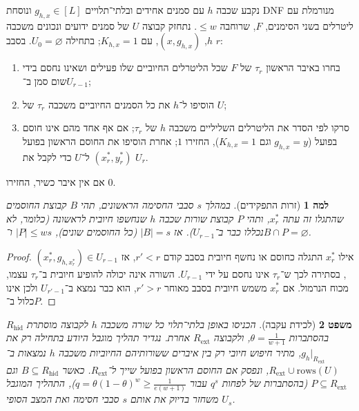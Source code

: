 \documentclass[11pt,a4paper]{article}
\newtheorem{theorem}{משפט}[section]
\newtheorem{lemma}[theorem]{למה}
\theoremstyle{definition}
\theoremstyle{remark}
\newcommand{\EN}[1]{\textenglish{#1}}
\begin{document}
נקבע שכבה $h$ עם סמנים אחידים ובלתי־תלויים $g_{h,x} \in [L]$ ונוסחת \EN{DNF} מנורמלת עם ליטרלים בשני הסימנים, $F$, שרוחבה $\le w$. נתחזק קבוצה $U$ של סמנים ידועים ונכונים משכבה $h$, $(x, g_{h,x})$, עם $K_{h,x} = 1$; בתחילה $U_0 = \varnothing$. בסבב $r$:
\begin{enumerate}
\item בחרו באיבר הראשון $\tau_r$ של $F$ שכל הליטרלים החיוביים שלו פעילים ושאינו נחסם בידי שום סמן ב־$U_{r-1}$;
\item הוסיפו ל־$h$ את כל הסמנים החיוביים משכבה $\tau_r$ של $U$;
\item סרקו לפי הסדר את הליטרלים השליליים משכבה $h$ של $\tau_r$; אם אף אחד מהם אינו חוסם בפועל ($g_{h,x} = y$ וגם $K_{h,x} = 1$), החזירו $1$; אחרת הוסיפו את החוסם הראשון בפועל $(x_r^*, y_r^*)$ ל־$U$ כדי לקבל את $U_r$.
\end{enumerate}
אם אין איבר כשיר, החזירו $0$.

\begin{lemma}[זרות התפקידים]
\label{lem:role-disjoint}
במהלך $s$ סבבי החסימה הראשונים, תהי $B$ קבוצת החוסמים שהתגלו זה עתה $x_r^*$, ותהי $P$ קבוצת שורות שכבה $h$ שנחשפו חיובית \emph{לראשונה} (כלומר, לא נכללו כבר ב־$U_{r-1}$). אז $|B| = s$ (כל החוסמים שונים), $|P| \le ws$ ו־$B \cap P = \varnothing$.
\end{lemma}

\begin{proof}
אילו $x_r^*$ התגלה כחוסם או נחשף חיובית בסבב קודם $r' < r$, אז $(x_r^*, g_{h,x_r^*}) \in U_{r-1}$, בסתירה לכך ש־$\tau_r$ אינו נחסם על ידי $U_{r-1}$. השורה אינה יכולה להופיע חיובית ב־$\tau_r$ עצמו, מכוח הנרמול. אם $x_r^*$ משמש חיובית בסבב מאוחר $r' > r$, הוא כבר נמצא ב־$U_{r'-1}$ ולכן אינו כלול ב־$P$.
\end{proof}

\begin{theorem}[לכידת עקבה]
\label{thm:trace-capture}
הכניסו באופן בלתי־תלוי כל שורה משכבה $h$ לקבוצה מוסתרת $R_{\mathrm{hid}}$ בהסתברות $\theta = \frac{1}{w+1}$, ולקבוצה $R_{\mathrm{ext}}$ אחרת. נגדיר תהליך מוגבל היודע בתחילה רק את $g_h|_{R_{\mathrm{ext}}}$, מתיר חיפוש חיובי רק בין איברים ששורותיהם החיוביות משכבה $h$ נמצאות ב־$R_{\mathrm{ext}} \cup \mathrm{rows}(U)$, ונפסק אם החוסם הראשון בפועל שייך ל־$R_{\mathrm{ext}}$. כאשר $B \subseteq R_{\mathrm{hid}}$ וגם $P \subseteq R_{\mathrm{ext}}$ (בהסתברות של לפחות $q^s$ עבור $q = \theta(1-\theta)^w \ge \frac{1}{e(w+1)}$), התהליך המוגבל משחזר בדיוק את אותם $s$ סבבי חסימה ואת המצב הסופי $U_s$.
\end{theorem}
\end{document}
